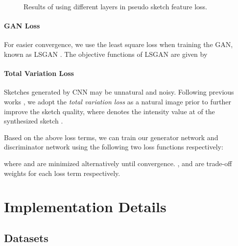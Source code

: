 \documentclass[runningheads]{llncs}
\begin{document}
\begin{figure*}
  \captionsetup[subfigure]{labelformat=empty}
  \centering
    \caption{Results of using different layers in pseudo sketch feature loss.}
    \label{fig:layer-example}
\end{figure*}

\paragraph{GAN Loss} For easier convergence, we use the least square loss when training the GAN, known as LSGAN \cite{mao2017least}. The objective functions of LSGAN are given by


\paragraph{Total Variation Loss} Sketches generated by CNN may be unnatural and noisy. Following previous works \cite{johnson2016perceptual,li2016combining,Kaur2017}, we adopt the {\em total variation loss} as a natural image prior to further improve the sketch quality, 
where  denotes the intensity value at  of the synthesized sketch .

Based on the above loss terms, we can train our generator network  and discriminator network  using the following two loss functions respectively:

where  and  are minimized alternatively until convergence. ,  and  are trade-off weights for each loss term respectively.

\section{Implementation Details}

\subsection{Datasets}
\end{document}
